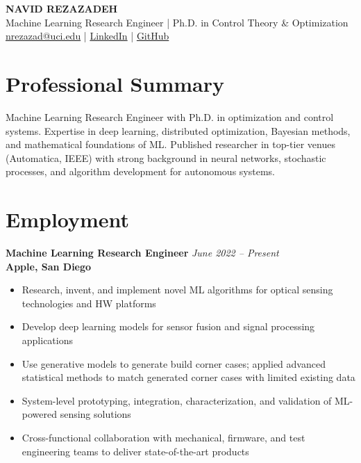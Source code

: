 \documentclass[11pt,letterpaper]{article}
\begin{document}
\begin{center}
    {\LARGE \textbf{NAVID REZAZADEH}}\\
    \vspace{2pt}
    Machine Learning Research Engineer | Ph.D. in Control Theory \& Optimization\\
    \vspace{2pt}
    \href{mailto:nrezazad@uci.edu}{nrezazad@uci.edu} | \href{https://www.linkedin.com/in/nrezazadeh/}{LinkedIn} | \href{https://github.com/navidre91}{GitHub}
\end{center}

\vspace{-8pt}

\section*{Professional Summary}
Machine Learning Research Engineer with Ph.D. in optimization and control systems. Expertise in deep learning, distributed optimization, Bayesian methods, and mathematical foundations of ML. Published researcher in top-tier venues (Automatica, IEEE) with strong background in neural networks, stochastic processes, and algorithm development for autonomous systems.

\section*{Employment}

\textbf{Machine Learning Research Engineer} \hfill \textit{June 2022 -- Present}\\
\textbf{Apple, San Diego}
\begin{itemize}[leftmargin=*, itemsep=0pt, parsep=2pt]
    \item Research, invent, and implement novel ML algorithms for optical sensing technologies and HW platforms
    \item Develop deep learning models for sensor fusion and signal processing applications
    \item Use generative models to generate build corner cases; applied advanced statistical methods to match generated corner cases with limited existing data
    \item System-level prototyping, integration, characterization, and validation of ML-powered sensing solutions
    \item Cross-functional collaboration with mechanical, firmware, and test engineering teams to deliver state-of-the-art products
\end{itemize}
\end{document}
